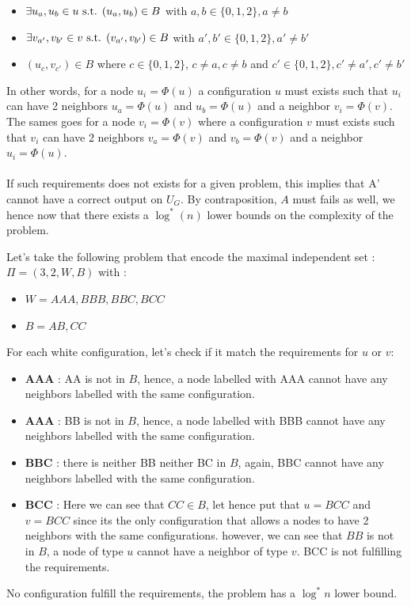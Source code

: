 \begin{itemize}
    \item $\exists u_a,u_b \in u \hbox{ s.t. } (u_a,u_b)\in B$ with $a,b\in \{0,1,2\}, a\neq b$
    \item $\exists v_{a'},v_{b'} \in v \hbox{ s.t. } (v_{a'},v_{b'})\in B$ with $a',b'\in \{0,1,2\}, a'\neq b'$
    \item $(u_c,v_{c'})\in B$ where $c \in \{0,1,2\}$, $c\neq a, c\neq b$ and $c' \in \{0,1,2\}, c'\neq a', c'\neq b'$
\end{itemize}
In other words, for a node $u_i = \Phi(u)$ a configuration $u$ must exists such that $u_i$ can have 2 neighbors $u_a = \Phi(u)$ and $u_b = \Phi(u)$ and a neighbor $v_i = \Phi(v)$.
The sames goes for a node $v_i = \Phi(v)$ where a configuration $v$ must exists such that $v_i$ can have 2 neighbors $v_a = \Phi(v)$ and $v_b = \Phi(v)$ and a neighbor $u_i = \Phi(u)$.\\\\
If such requirements does not exists for a given problem, this implies that A' cannot have a correct output on $U_G$. By contraposition, $A$ must fails as well, we hence now that there exists a $\log^*(n)$ lower bounds on the complexity of the problem.
\begin{exmp}
Let's take the following problem that encode the maximal independent set : $\Pi=(3,2,W,B)$ with :
\begin{itemize}
    \item $W = AAA, BBB, BBC, BCC$
    \item $B = AB, CC$
\end{itemize}
For each white configuration, let's check if it match the requirements for $u$ or $v$:
\begin{itemize}
    \item \textbf{AAA} : AA is not in $B$, hence, a node labelled with AAA cannot have any neighbors labelled with the same configuration.
    \item \textbf{AAA} : BB is not in $B$, hence, a node labelled with BBB cannot have any neighbors labelled with the same configuration.
    \item \textbf{BBC} : there is neither BB neither BC in $B$, again, BBC cannot have any neighbors labelled with the same configuration.
    \item \textbf{BCC} : Here we can see that $CC\in B$, let hence put that $u = BCC$ and $v = BCC$ since its the only configuration that allows a nodes to have 2 neighbors with the same configurations. however, we can see that $BB$ is not in $B$, a node of type $u$ cannot have a neighbor of type $v$. BCC is not fulfilling the requirements.
\end{itemize}
No configuration fulfill the requirements, the problem has a $\log^*n$ lower bound.
\end{exmp}
